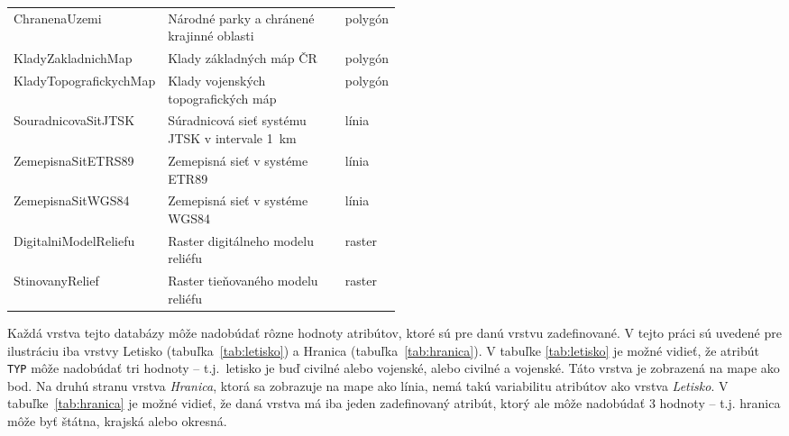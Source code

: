 \begin{table}[H]
\begin{tabular}{|l|p{0.5\linewidth}|l|}
    ChranenaUzemi          & Národné parky a chránené krajinné oblasti      & polygón            \\
    KladyZakladnichMap     & Klady základných máp ČR                        & polygón            \\
    KladyTopografickychMap & Klady vojenských topografických máp            & polygón            \\
    SouradnicovaSitJTSK    & Súradnicová sieť systému JTSK v intervale 1~km & línia              \\
    ZemepisnaSitETRS89     & Zemepisná sieť v systéme ETR89                 & línia              \\
    ZemepisnaSitWGS84      & Zemepisná sieť v systéme WGS84                 & línia              \\
    DigitalniModelReliefu  & Raster digitálneho modelu reliéfu              & raster             \\
    StinovanyRelief        & Raster tieňovaného modelu reliéfu              & raster             \\ \hline
\end{tabular}
\end{table}

Každá vrstva tejto databázy môže nadobúdať rôzne hodnoty atribútov, ktoré sú pre danú vrstvu zadefinované. V tejto práci sú uvedené pre ilustráciu iba vrstvy Letisko (tabuľka~\ref{tab:letisko}) a Hranica (tabuľka~\ref{tab:hranica}). V tabuľke \ref{tab:letisko} je možné vidieť, že atribút \texttt{TYP} môže nadobúdať tri hodnoty \--- t.j.~letisko je buď civilné alebo vojenské, alebo civilné a vojenské. Táto vrstva je zobrazená na mape ako bod. Na druhú stranu vrstva \emph{Hranica}, ktorá sa zobrazuje na mape ako línia, nemá takú variabilitu atribútov ako vrstva \emph{Letisko}. V tabuľke~\ref{tab:hranica} je možné vidieť, že daná vrstva má iba jeden zadefinovaný atribút, ktorý ale môže nadobúdať 3 hodnoty \--- t.j. hranica môže byť štátna, krajská alebo okresná.

